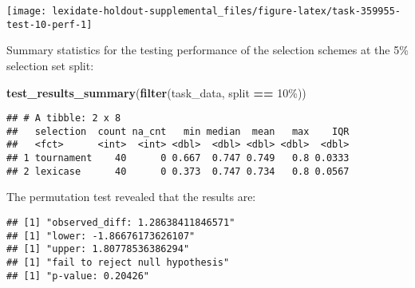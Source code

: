 \documentclass[
]{book}
\newenvironment{Shaded}{\begin{snugshade}}{\end{snugshade}}
\newcommand{\AttributeTok}[1]{\textcolor[rgb]{0.13,0.29,0.53}{#1}}
\newcommand{\DecValTok}[1]{\textcolor[rgb]{0.00,0.00,0.81}{#1}}
\newcommand{\FunctionTok}[1]{\textcolor[rgb]{0.13,0.29,0.53}{\textbf{#1}}}
\newcommand{\NormalTok}[1]{#1}
\newcommand{\OtherTok}[1]{\textcolor[rgb]{0.56,0.35,0.01}{#1}}
\newcommand{\SpecialCharTok}[1]{\textcolor[rgb]{0.81,0.36,0.00}{\textbf{#1}}}
\newcommand{\StringTok}[1]{\textcolor[rgb]{0.31,0.60,0.02}{#1}}
\begin{document}
\texttt{[image: lexidate-holdout-supplemental\_files/figure-latex/task-359955-test-10-perf-1]}

Summary statistics for the testing performance of the selection schemes at the 5\% selection set split:

\begin{Shaded}
\begin{Highlighting}[]
\FunctionTok{test\_results\_summary}\NormalTok{(}\FunctionTok{filter}\NormalTok{(task\_data, split }\SpecialCharTok{==} \StringTok{\textquotesingle{}10\%\textquotesingle{}}\NormalTok{))}
\end{Highlighting}
\end{Shaded}

\begin{verbatim}
## # A tibble: 2 x 8
##   selection  count na_cnt   min median  mean   max    IQR
##   <fct>      <int>  <int> <dbl>  <dbl> <dbl> <dbl>  <dbl>
## 1 tournament    40      0 0.667  0.747 0.749   0.8 0.0333
## 2 lexicase      40      0 0.373  0.747 0.734   0.8 0.0567
\end{verbatim}

The permutation test revealed that the results are:

\begin{Shaded}
\end{Shaded}

\begin{verbatim}
## [1] "observed_diff: 1.28638411846571"
## [1] "lower: -1.86676173626107"
## [1] "upper: 1.80778536386294"
## [1] "fail to reject null hypothesis"
## [1] "p-value: 0.20426"
\end{verbatim}
\end{document}
